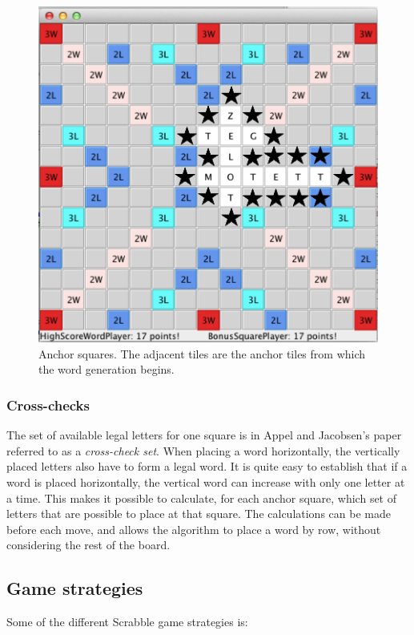 \documentclass[a4paper, 12pt]{report}
\begin{document}
\begin{figure}[h]
\centering
\includegraphics[scale=0.3]{anchors}
\caption{Anchor squares. The adjacent tiles are the anchor tiles from which the word generation begins.}
\label{fig:anchors}
\end{figure}

\subsubsection{Cross-checks}
\label{sec:crosscheck}
The set of available legal letters for one square is in Appel and Jacobsen's paper \cite{fastest} referred to as a \emph{cross-check set}. When placing a word horizontally, the vertically placed letters also have to form a legal word. It is quite easy to establish that if a word is placed horizontally, the vertical word can increase with only one letter at a time. This makes it possible to calculate, for each anchor square, which set of letters that are possible to place at that square. The calculations can be made before each move, and allows the algorithm to place a word by row, without considering the rest of the board. 

\subsection{Game strategies}
\label{sec:strategies}
Some of the different Scrabble game strategies is:
\end{document}
